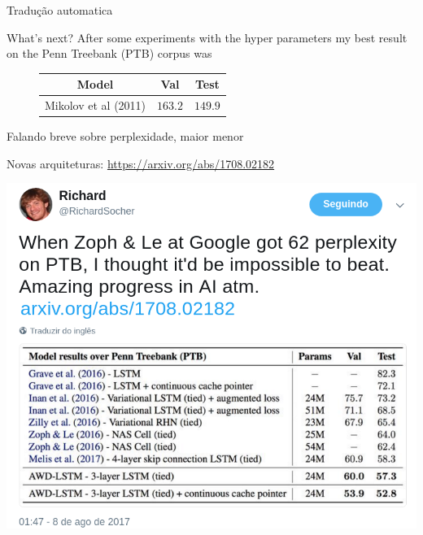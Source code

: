 \documentclass[10pt]{beamer}
\begin{document}
\begin{frame}{Tradução automatica}

\end{frame}


\begin{frame}{What's next?}
After some experiments with the hyper parameters my best result on the \alert{Penn Treebank (PTB)} corpus was

\vspace{0.5cm}

\begin{figure}
\begin{center}
\begin{tabular}{|c|c|c|}
\hline
\cellcolor{blue!60}Model & \cellcolor{blue!60}Val & \cellcolor{blue!60}Test  \\ \hline
Mikolov et al (2011)\cite{Mikolov11} & $163.2$  & $149.9$ \\ \hline
\end{tabular}
\end{center}
\end{figure}

Falando breve sobre perplexidade, maior menor
\end{frame}

\begin{frame}{Novas arquiteturas: \url{https://arxiv.org/abs/1708.02182}}

\begin{center}
\includegraphics[scale=0.34]{images/SocherPTB.png}
\end{center}
\end{frame}
\end{document}

